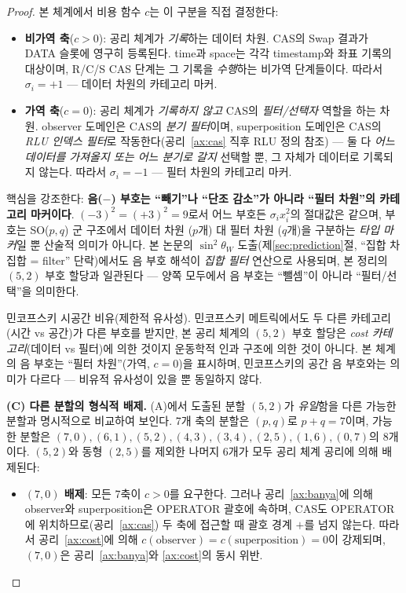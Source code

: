\documentclass[entropy,article,submit,pdftex,oneauthor]{Definitions/mdpi}
\begin{document}
\begin{proof}
본 체계에서 비용 함수 $c$는 이 구분을 직접 결정한다:
\begin{itemize}
\item \textbf{비가역 축}($c > 0$): 공리 체계가 \emph{기록}하는 데이터 차원. CAS의 Swap 결과가 DATA 슬롯에 영구히 등록된다. time과 space는 각각 timestamp와 좌표 기록의 대상이며, R/C/S CAS 단계는 그 기록을 \emph{수행}하는 비가역 단계들이다. 따라서 $\sigma_i = +1$ --- 데이터 차원의 카테고리 마커.
\item \textbf{가역 축}($c = 0$): 공리 체계가 \emph{기록하지 않고} CAS의 \emph{필터/선택자} 역할을 하는 차원. observer 도메인은 CAS의 \emph{분기 필터}이며, superposition 도메인은 CAS의 \emph{RLU 인덱스 필터}로 작동한다(공리~\ref{ax:cas} 직후 RLU 정의 참조) --- 둘 다 \emph{어느 데이터를 가져올지 또는 어느 분기로 갈지} 선택할 뿐, 그 자체가 데이터로 기록되지 않는다. 따라서 $\sigma_i = -1$ --- 필터 차원의 카테고리 마커.
\end{itemize}

핵심을 강조한다: \textbf{음($-$) 부호는 ``빼기''나 ``단조 감소''가 아니라 ``필터 차원''의 카테고리 마커이다}. $(-3)^2 = (+3)^2 = 9$로서 어느 부호든 $\sigma_i x_i^2$의 절대값은 같으며, 부호는 SO($p,q$) 군 구조에서 데이터 차원 ($p$개) 대 필터 차원 ($q$개)을 구분하는 \emph{타입 마커}일 뿐 산술적 의미가 아니다. 본 논문의 $\sin^2\theta_W$ 도출(제\ref{sec:prediction}절, ``집합 차집합 = filter'' 단락)에서도 음 부호 해석이 \emph{집합 필터} 연산으로 사용되며, 본 정리의 $(5,2)$ 부호 할당과 일관된다 --- 양쪽 모두에서 음 부호는 ``뺄셈''이 아니라 ``필터/선택''을 의미한다.

민코프스키 시공간 비유(제한적 유사성). 민코프스키 메트릭에서도 두 다른 카테고리(시간 vs 공간)가 다른 부호를 받지만, 본 공리 체계의 $(5, 2)$ 부호 할당은 \emph{cost 카테고리}(데이터 vs 필터)에 의한 것이지 운동학적 인과 구조에 의한 것이 아니다. 본 체계의 음 부호는 ``필터 차원''(가역, $c = 0$)을 표시하며, 민코프스키의 공간 음 부호와는 의미가 다르다 --- 비유적 유사성이 있을 뿐 동일하지 않다.

\textbf{(C) 다른 분할의 형식적 배제.} (A)에서 도출된 분할 $(5,2)$가 \emph{유일}함을 다른 가능한 분할과 명시적으로 비교하여 보인다. 7개 축의 분할은 $(p, q)$로 $p + q = 7$이며, 가능한 분할은 $(7,0), (6,1), (5,2), (4,3), (3,4), (2,5), (1,6), (0,7)$의 8개이다. $(5,2)$와 동형 $(2,5)$를 제외한 나머지 6개가 모두 공리 체계 공리에 의해 배제된다:
\begin{itemize}
\item \textbf{$(7,0)$ 배제}: 모든 7축이 $c > 0$를 요구한다. 그러나 공리~\ref{ax:banya}에 의해 observer와 superposition은 OPERATOR 괄호에 속하며, CAS도 OPERATOR에 위치하므로(공리~\ref{ax:cas}) 두 축에 접근할 때 괄호 경계 $+$를 넘지 않는다. 따라서 공리~\ref{ax:cost}에 의해 $c(\text{observer}) = c(\text{superposition}) = 0$이 강제되며, $(7,0)$은 공리~\ref{ax:banya}와 \ref{ax:cost}의 동시 위반.


\end{itemize}
\end{proof}
\end{document}
